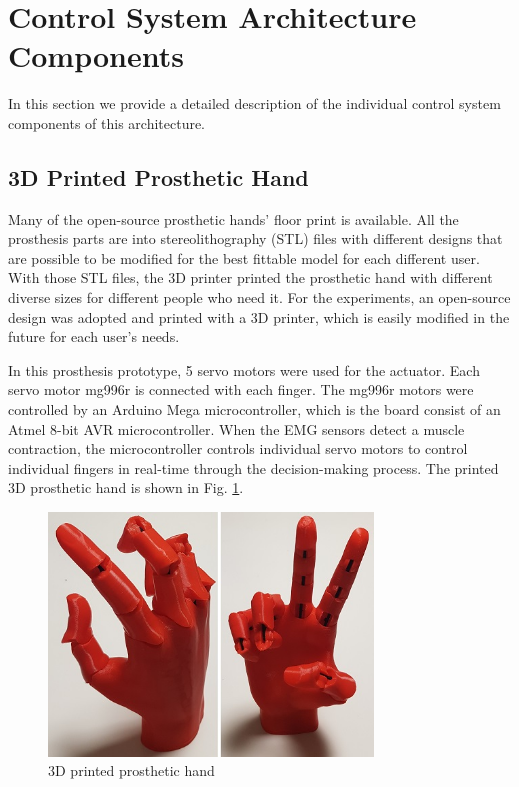 \documentclass[conference]{IEEEtran}
\begin{document}
\section{Control System Architecture Components}
In this section we provide a detailed description of the individual control system components of this architecture.




\subsection{3D Printed Prosthetic Hand}
Many of the open-source prosthetic hands' floor print is available. All the prosthesis parts are into stereolithography (STL) files with different designs that are possible to be modified for the best fittable model for each different user. With those STL files, the 3D printer printed the prosthetic hand with different diverse sizes for different people who need it. For the experiments, an open-source design was adopted and printed with a 3D printer, which is easily modified in the future for each user's needs.

In this prosthesis prototype, 5 servo motors were used for the actuator. Each servo motor mg996r is connected with each finger. The mg996r motors were controlled by an Arduino Mega microcontroller, which is the board consist of an Atmel 8-bit AVR microcontroller. When the EMG sensors detect a muscle contraction, the microcontroller controls individual servo motors to control individual fingers in real-time through the decision-making process. The printed 3D prosthetic hand is shown in Fig. \ref{hand}.

\begin{figure}[h]
  \centering
  \includegraphics[width=3.4in]{3dhand3.jpg}
  \caption{3D printed prosthetic hand}
  \label{hand}
\end{figure}
\end{document}
